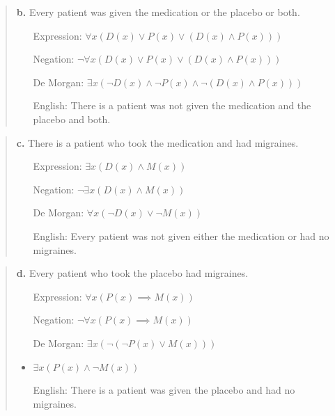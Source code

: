 \documentclass[11pt, oneside]{article}
\begin{document}
\begin{quote}
    \textbf{b. }Every patient was given the medication or the placebo or both.

    \begin{itemize}
        \item[Expression:] $\forall x(D(x) \lor P(x) \lor (D(x) \land P(x)))$
        \item[Negation:] $\neg \forall x(D(x) \lor P(x) \lor (D(x) \land P(x)))$
        \item[De Morgan:] $\exists x(\neg D(x) \land \neg P(x) \land \neg (D(x) \land P(x)))$
        \item[English:] There is a patient was not given the medication and the placebo and both.
    \end{itemize}
\end{quote}

\begin{quote}
    \textbf{c. }There is a patient who took the medication and had migraines.

    \begin{itemize}
        \item[Expression:] $\exists x(D(x) \land M(x))$
        \item[Negation:] $\neg \exists x(D(x) \land M(x))$
        \item[De Morgan:] $\forall x(\neg D(x) \lor \neg M(x))$
        \item[English:] Every patient was not given either the medication or had no migraines.
    \end{itemize}
\end{quote}

\begin{quote}
    \textbf{d. }Every patient who took the placebo had migraines.

    \begin{itemize}
        \item[Expression:] $\forall x(P(x) \implies M(x))$
        \item[Negation:] $\neg \forall x(P(x) \implies M(x))$
        \item[De Morgan:] $\exists x(\neg (\neg P(x) \lor M(x)))$
        \item $\exists x (P(x) \land \neg M(x))$ 
        \item[English:] There is a patient was given the placebo and had no migraines.
    \end{itemize}
\end{quote}
\end{document}
